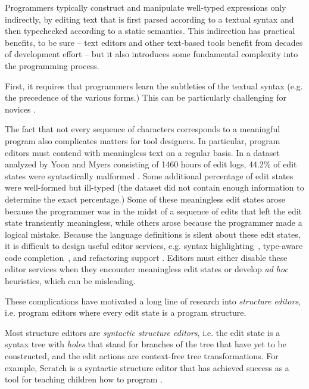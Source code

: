 
Programmers typically construct and manipulate well-typed expressions only
indirectly, by editing text that is first parsed according to a textual
syntax and then typechecked according to a static semantics. This
indirection has practical benefits, to be sure -- text editors and other
text-based tools benefit from decades of development effort -- but it also
introduces some fundamental complexity into the programming process.

First, it requires that programmers learn the subtleties of the textual
syntax (e.g. the precedence of the various forms.) This can be particularly
challenging for novices \cite{Altadmri:2015:MCI:2676723.2677258}.

The fact that not every sequence of characters corresponds to a meaningful
program also complicates matters for tool designers. In particular, program
editors must contend with meaningless text on a regular basis. In a dataset
analyzed by Yoon and Myers consisting of 1460 hours of edit logs, 44.2\% of
edit states were syntactically malformed \cite{6883030}. Some additional
percentage of edit states were well-formed but ill-typed (the dataset did
not contain enough information to determine the exact percentage.)  Some of
these meaningless edit states arose because the programmer was in the midst
of a sequence of edits that left the edit state transiently meaningless,
while others arose because the programmer made a logical mistake. Because
the language definitions is silent about these edit states, it is difficult
to design useful editor services, e.g. syntax
highlighting~\cite{sarkar2015impact}, type-aware code
completion~\cite{Mooty:2010:CCC:1915084.1916348,Omar:2012:ACC:2337223.2337324},
and refactoring support \cite{mens2004survey}. Editors must either disable
these editor services when they encounter meaningless edit states or
develop \emph{ad hoc} heuristics, which can be misleading.

These complications have motivated a long line of research
into \emph{structure editors}, i.e. program editors where every edit state
is a program structure.

Most structure editors are \emph{syntactic structure editors}, i.e. the
edit state is a syntax tree with \emph{holes} that stand for branches of
the tree that have yet to be constructed, and the edit actions are
context-free tree transformations. For example, Scratch is a syntactic
structure editor that has achieved success as a tool for teaching children
how to program \cite{Resnick:2009:SP:1592761.1592779}.

